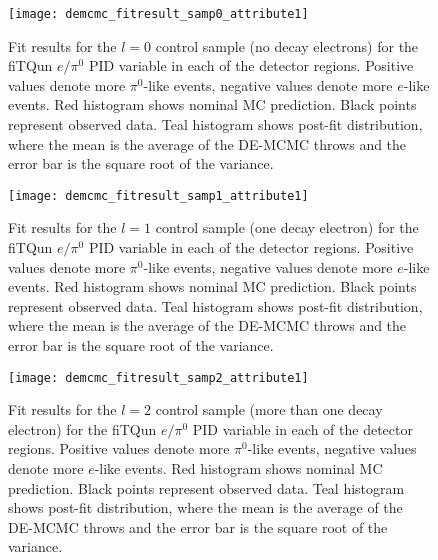 \begin{figure}[h]
  \begin{center}
    \texttt{[image: demcmc\_fitresult\_samp0\_attribute1]} 
  \end{center}
  \caption{Fit results for the $l=0$ control sample (no decay electrons) for
  the fiTQun $e/\pi^{0}$ PID variable in each of the detector regions. Positive
  values denote more $\pi^{0}$-like events, negative values denote more
  $e$-like events. Red histogram shows nominal MC prediction.  Black points
  represent observed data.  Teal histogram shows post-fit distribution, where
  the mean is the average of the DE-MCMC throws and the error bar is the square
  root of the variance.}
  \label{fig:fitresults_samp0_att1}
\end{figure}


\begin{figure}[h]
  \begin{center}
    \texttt{[image: demcmc\_fitresult\_samp1\_attribute1]} 
  \end{center}
  \caption{Fit results for the $l=1$ control sample (one decay electron) for
  the fiTQun $e/\pi^{0}$ PID variable in each of the detector regions. Positive
  values denote more $\pi^{0}$-like events, negative values denote more
  $e$-like events. Red histogram shows nominal MC prediction.  Black points
  represent observed data.  Teal histogram shows post-fit distribution, where
  the mean is the average of the DE-MCMC throws and the error bar is the square
  root of the variance.}
  \label{fig:fitresults_samp1_att1}
\end{figure}


\begin{figure}[h]
  \begin{center}
    \texttt{[image: demcmc\_fitresult\_samp2\_attribute1]} 
  \end{center}
  \caption{Fit results for the $l=2$ control sample (more than one decay
  electron) for the fiTQun $e/\pi^{0}$ PID variable in each of the detector
  regions.  Positive values denote more $\pi^{0}$-like events, negative values
  denote more $e$-like events. Red histogram shows nominal MC prediction.
  Black points represent observed data.  Teal histogram shows post-fit
  distribution, where the mean is the average of the DE-MCMC throws and the
  error bar is the square root of the variance.}
  \label{fig:fitresults_samp2_att1}
\end{figure}


